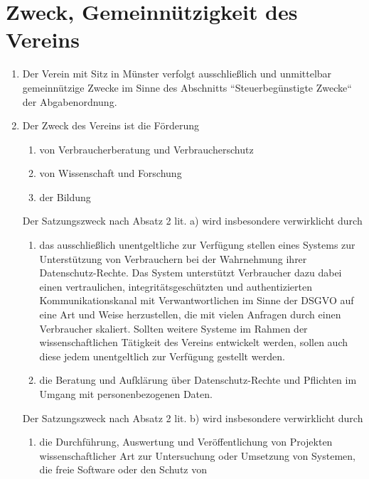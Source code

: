 \section{Zweck, Gemeinnützigkeit des Vereins}
\begin{enumerate}[label=(\arabic*)]
    \item Der Verein mit Sitz in Münster verfolgt ausschließlich und
        unmittelbar gemeinnützige Zwecke im Sinne des Abschnitts
        ``Steuerbegünstigte Zwecke`` der Abgabenordnung.
    \item Der Zweck des Vereins ist die Förderung
        \begin{enumerate}[label=\alph*)]
            \item von Verbraucherberatung und Verbraucherschutz
            \item von Wissenschaft und Forschung 
            \item der Bildung
        \end{enumerate}
        Der Satzungszweck nach Absatz 2 lit. a) wird insbesondere verwirklicht
        durch
        \begin{enumerate}[label=\alph*)]
            \item das ausschließlich unentgeltliche zur Verfügung stellen eines
                Systems zur Unterstützung von Verbrauchern bei der Wahrnehmung
                ihrer Datenschutz-Rechte. Das System unterstützt Verbraucher dazu
                dabei einen vertraulichen, integritätsgeschützten und authentizierten
                Kommunikationskanal mit Verwantwortlichen im Sinne der DSGVO
                auf eine Art und Weise herzustellen, die mit vielen Anfragen
                durch einen Verbraucher skaliert. Sollten weitere Systeme im
                Rahmen der wissenschaftlichen Tätigkeit des Vereins entwickelt
                werden, sollen auch diese jedem unentgeltlich zur Verfügung
                gestellt werden.
            \item die Beratung und Aufklärung über Datenschutz-Rechte und
                Pflichten im Umgang mit personenbezogenen Daten.
        \end{enumerate}
        Der Satzungszweck nach Absatz 2 lit. b) wird insbesondere verwirklicht
        durch
        \begin{enumerate}[label=\alph*)]
            \item die Durchführung, Auswertung und Veröffentlichung von
                Projekten wissenschaftlicher Art zur Untersuchung oder
                Umsetzung von Systemen, die freie Software oder den Schutz von

\end{enumerate}
\end{enumerate}
